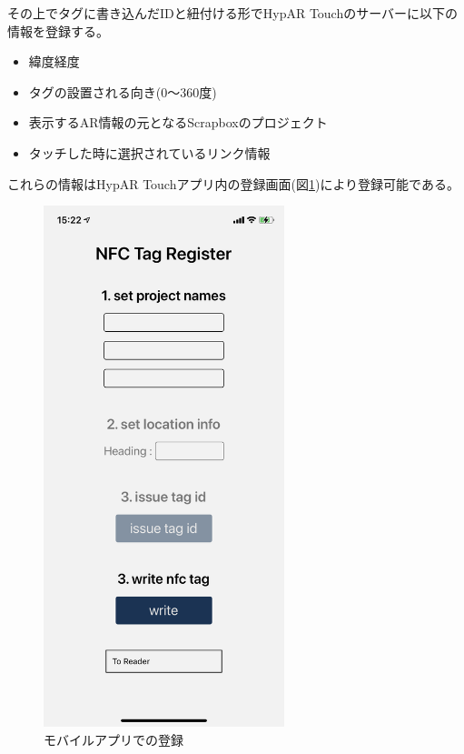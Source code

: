 その上でタグに書き込んだIDと紐付ける形でHypAR Touchのサーバーに以下の情報を登録する。
\begin{itemize}
  \item 緯度経度
  \item タグの設置される向き(0〜360度)
  \item 表示するAR情報の元となるScrapboxのプロジェクト
  \item タッチした時に選択されているリンク情報
\end{itemize}
これらの情報はHypAR Touchアプリ内の登録画面(図\ref{fig:nfc_register_mobile})により登録可能である。

\begin{figure}[H]
  \centering
  \includegraphics[width=70mm]{images/nfc_register_mobile.png}
  \caption{モバイルアプリでの登録} \label{fig:nfc_register_mobile}
\end{figure}
